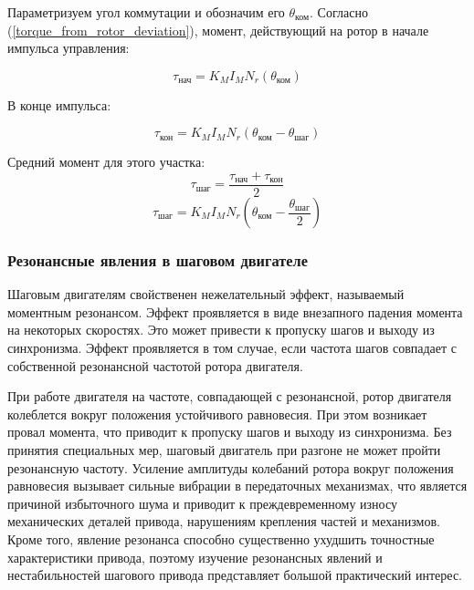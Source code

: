 Параметризуем угол коммутации и обозначим его $\theta_{\textit{ком}}$.
Согласно (\ref{torque_from_rotor_deviation}), момент, действующий на ротор
в начале импульса управления:

\begin{equation}
    \label{moment_to_rotor_at_the_begin_of_control_pulse}
    \tau_{\textit{нач}} = K_{M} I_{M} N_{r} ( \theta_{\textit{ком}} )
\end{equation}

В конце импульса:

\begin{equation}
    \label{moment_to_rotor_at_the_end_of_control_pulse}
    \tau_{\textit{кон}} = K_{M} I_{M} N_{r} ( \theta_{\textit{ком}} - \theta_{\textit{шаг}} )
\end{equation}

Средний момент для этого участка:
$$
    \tau_{\textit{шаг}} = \frac{ \tau_{\textit{нач}} + \tau_{\textit{кон}} }{ 2 }
$$
$$
    \tau_{\textit{шаг}} = K_{M} I_{M} N_{r} ( \theta_{\textit{ком}} - \frac{ \theta_{\textit{шаг}} }{ 2 } )
$$

\subsubsection{Резонансные явления в шаговом двигателе}
Шаговым двигателям свойственен нежелательный эффект, называемый моментным резонансом. Эффект
проявляется в виде внезапного падения момента на некоторых скоростях. Это может привести к пропуску
шагов и выходу из синхронизма. Эффект проявляется в том случае, если частота шагов совпадает с
собственной резонансной частотой ротора двигателя.

При работе двигателя на частоте, совпадающей с резонансной, ротор двигателя колеблется вокруг
положения устойчивого равновесия. При этом возникает провал момента, что приводит к пропуску шагов и
выходу из синхронизма. Без принятия специальных мер, шаговый двигатель при разгоне не может пройти резонансную
частоту. Усиление амплитуды колебаний ротора вокруг положения равновесия вызывает сильные вибрации в
передаточных механизмах, что является причиной избыточного шума и приводит к преждевременному износу
механических деталей привода, нарушениям крепления частей и механизмов. Кроме того,
явление резонанса способно существенно ухудшить точностные характеристики привода, поэтому изучение
резонансных явлений и нестабильностей шагового привода представляет большой практический интерес.
\newline

